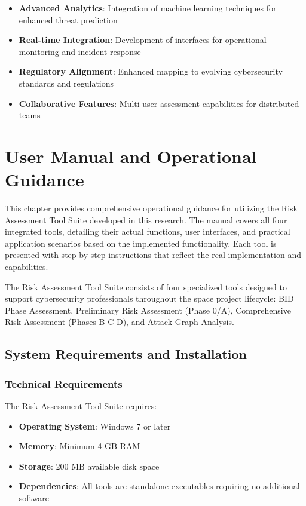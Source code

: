 \documentclass[binding=0.6cm]{sapthesis}
\begin{document}
\begin{itemize}
    \item \textbf{Advanced Analytics}: Integration of machine learning techniques for enhanced threat prediction
    \item \textbf{Real-time Integration}: Development of interfaces for operational monitoring and incident response
    \item \textbf{Regulatory Alignment}: Enhanced mapping to evolving cybersecurity standards and regulations
    \item \textbf{Collaborative Features}: Multi-user assessment capabilities for distributed teams
\end{itemize}

\chapter{User Manual and Operational Guidance}
\label{ch:user_manual}

This chapter provides comprehensive operational guidance for utilizing the Risk Assessment Tool Suite developed in this research. The manual covers all four integrated tools, detailing their actual functions, user interfaces, and practical application scenarios based on the implemented functionality. Each tool is presented with step-by-step instructions that reflect the real implementation and capabilities.

The Risk Assessment Tool Suite consists of four specialized tools designed to support cybersecurity professionals throughout the space project lifecycle: BID Phase Assessment, Preliminary Risk Assessment (Phase 0/A), Comprehensive Risk Assessment (Phases B-C-D), and Attack Graph Analysis.

\section{System Requirements and Installation}

\subsection{Technical Requirements}

The Risk Assessment Tool Suite requires:

\begin{itemize}
    \item \textbf{Operating System}: Windows 7 or later
    \item \textbf{Memory}: Minimum 4 GB RAM
    \item \textbf{Storage}: 200 MB available disk space
    \item \textbf{Dependencies}: All tools are standalone executables requiring no additional software
\end{itemize}
\end{document}

